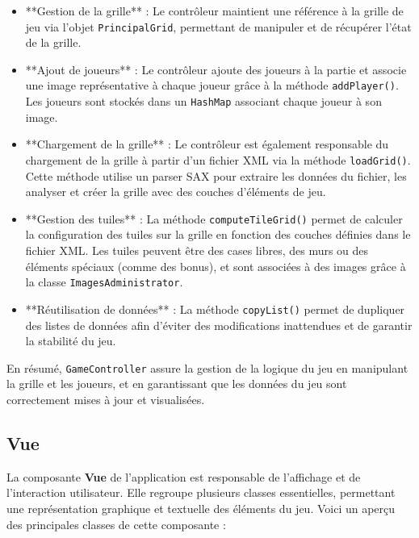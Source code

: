 \documentclass[12pt]{article}
\begin{document}
\begin{itemize}
    \item **Gestion de la grille** : Le contrôleur maintient une référence à la grille de jeu via l'objet \texttt{PrincipalGrid}, permettant de manipuler et de récupérer l'état de la grille.
    \item **Ajout de joueurs** : Le contrôleur ajoute des joueurs à la partie et associe une image représentative à chaque joueur grâce à la méthode \texttt{addPlayer()}. Les joueurs sont stockés dans un \texttt{HashMap} associant chaque joueur à son image.
    \item **Chargement de la grille** : Le contrôleur est également responsable du chargement de la grille à partir d'un fichier XML via la méthode \texttt{loadGrid()}. Cette méthode utilise un parser SAX pour extraire les données du fichier, les analyser et créer la grille avec des couches d'éléments de jeu.
    \item **Gestion des tuiles** : La méthode \texttt{computeTileGrid()} permet de calculer la configuration des tuiles sur la grille en fonction des couches définies dans le fichier XML. Les tuiles peuvent être des cases libres, des murs ou des éléments spéciaux (comme des bonus), et sont associées à des images grâce à la classe \texttt{ImagesAdministrator}.
    \item **Réutilisation de données** : La méthode \texttt{copyList()} permet de dupliquer des listes de données afin d'éviter des modifications inattendues et de garantir la stabilité du jeu.
\end{itemize}



En résumé, \texttt{GameController} assure la gestion de la logique du jeu en manipulant la grille et les joueurs, et en garantissant que les données du jeu sont correctement mises à jour et visualisées.


\subsection{Vue}

La composante \textbf{Vue} de l'application est responsable de l'affichage et de l'interaction utilisateur. Elle regroupe plusieurs classes essentielles, permettant une représentation graphique et textuelle des éléments du jeu. Voici un aperçu des principales classes de cette composante :
\end{document}
